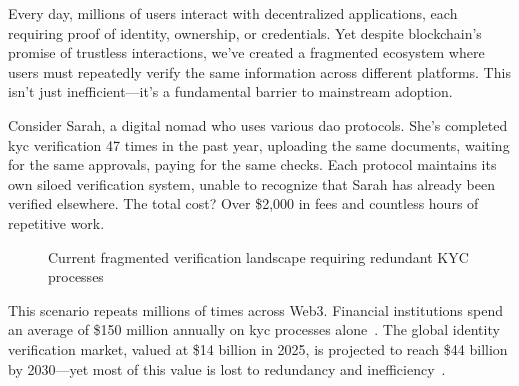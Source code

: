 \documentclass[11pt,a4paper]{article}
\begin{document}
Every day, millions of users interact with decentralized applications, each requiring proof of identity, ownership, or credentials. Yet despite blockchain's promise of trustless interactions, we've created a fragmented ecosystem where users must repeatedly verify the same information across different platforms. This isn't just inefficient---it's a fundamental barrier to mainstream adoption.

Consider Sarah, a digital nomad who uses various \gls{dao} protocols. She's completed \gls{kyc} verification 47 times in the past year, uploading the same documents, waiting for the same approvals, paying for the same checks. Each protocol maintains its own siloed verification system, unable to recognize that Sarah has already been verified elsewhere. The total cost? Over \$2,000 in fees and countless hours of repetitive work.

\begin{figure}[H]
\centering
{}
\caption{Current fragmented verification landscape requiring redundant KYC processes}
\label{fig:current-problem}
\end{figure}

This scenario repeats millions of times across Web3. Financial institutions spend an average of \$150 million annually on \gls{kyc} processes alone~\cite{thomson2024kyc}. The global identity verification market, valued at \$14 billion in 2025, is projected to reach \$44 billion by 2030---yet most of this value is lost to redundancy and inefficiency~\cite{marketresearch2024identity}.
\end{document}
